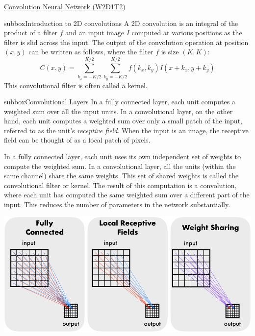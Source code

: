 \begin{textbox}{\href{https://compneuro.neuromatch.io/tutorials/W2D1_DeepLearning/student/W2D1_Tutorial2.html}{Convolution Neural Network (W2D1T2)} }
\begin{subbox}{subbox}{Introduction to 2D convolutions}
\scriptsize
A 2D convolution is an integral of the product of a filter $f$ and an input image $I$ computed at various positions as the filter is slid across the input. The output of the convolution operation at position $(x,y)$ can be written as follows, where the filter $f$ is size $(K,K)$:
\begin{equation}
C(x,y) = \sum_{k_x=-K/2}^{K/2} \sum_{k_y=-K/2}^{K/2} f(k_x,k_y) I(x+k_x,y+k_y)
\end{equation}
This convolutional filter is often called a kernel.
\end{subbox}
\begin{subbox}{subbox}{Convolutional Layers}
\scriptsize
In a fully connected layer, each unit computes a weighted sum over all the input units. In a convolutional layer, on the other hand, each unit computes a weighted sum over only a small patch of the input, referred to as the unit's \textit{receptive field}. When the input is an image, the receptive field can be thought of as a local patch of pixels.
  
In a fully connected layer, each unit uses its own independent set of weights to compute the weighted sum. In a convolutional layer, all the units (within the same channel) share the same weights. This set of shared weights is called the convolutional filter or kernel. The result of this computation is a convolution, where each unit has computed the same weighted sum over a different part of the input. This reduces the number of parameters in the network substantially.

\centering
\includegraphics[scale=0.2]{Figures/DL/DLFigure3.png}
\end{subbox}
\end{textbox}
